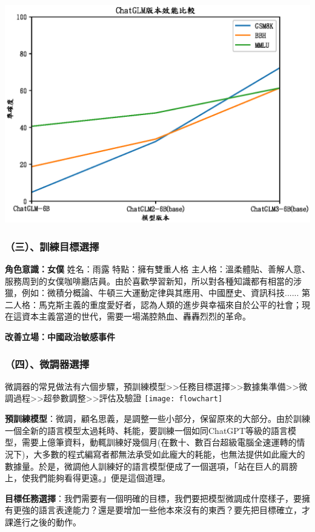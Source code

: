 \documentclass[8pt,a4paper,新細明體,UTF8,natbib]{article}
\begin{document}
\begin{CJK*}{UTF8}{bsmi}
	\includegraphics[width=\textwidth]{chatglmversion}
	
	\subsubsection{（三）、訓練目標選擇}
	\textbf{角色意識：女僕}
	姓名：雨露
	特點：擁有雙重人格
	主人格：溫柔體貼、善解人意、服務周到的女僕咖啡廳店員。由於喜歡學習新知，所以對各種知識都有相當的涉獵，例如：微積分概論、牛頓三大運動定律與其應用、中國歷史、資訊科技......
	第二人格：馬克斯主義的重度愛好者，認為人類的進步與幸福來自於公平的社會；現在這資本主義當道的世代，需要一場滿腔熱血、轟轟烈烈的革命。%


	\textbf{改善立場：中國政治敏感事件}


	\subsubsection{（四）、微調器選擇}
 微調器的常見做法有六個步驟，預訓練模型>>任務目標選擇>>數據集準備>>微調過程>>超參數調整>>評估及驗證
 \texttt{[image: flowchart]}

	\textbf{預訓練模型}：微調，顧名思義，是調整一些小部分，保留原來的大部分。由於訓練一個全新的語言模型太過耗時、耗能，要訓練一個如同ChatGPT等級的語言模型，需要上億筆資料，動輒訓練好幾個月(在數十、數百台超級電腦全速運轉的情況下)，大多數的程式編寫者都無法承受如此龐大的耗能，也無法提供如此龐大的數據量。於是，微調他人訓練好的語言模型便成了一個選項，「站在巨人的肩膀上，使我們能夠看得更遠。」便是這個道理。

	\textbf{目標任務選擇}：我們需要有一個明確的目標，我們要把模型微調成什麼樣子，要擁有更強的語言表達能力？還是要增加一些他本來沒有的東西？要先把目標確立，才課進行之後的動作。


\end{CJK*}
\end{document}
